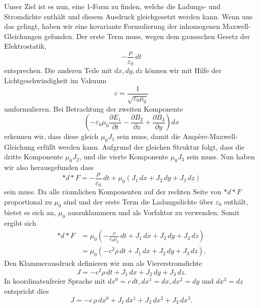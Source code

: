 Unser Ziel ist es nun, eine 1-Form zu finden, welche die Ladungs- und Stromdichte enthält und diesem Ausdruck gleichgesetzt werden kann.
Wenn uns das gelingt, haben wir eine kovariante Formulierung der inhomogenen Maxwell-Gleichungen gefunden.
Der erste Term muss, wegen dem gaussschen Gesetz der Elektrostatik, 
\begin{equation*}
	-\frac{\rho}{\varepsilon_0} \,dt
\end{equation*}
entsprechen.
Die anderen Teile mit $dx,dy,dz$ können wir mit Hilfe der Lichtgeschwindigkeit im Vakuum 
\begin{equation*}
	c = \frac{1}{\sqrt{\varepsilon_0 \mu_0}}
\end{equation*}
umformulieren.
Bei Betrachtung der zweiten Komponente
\begin{equation*}
	\left(-\varepsilon_0 \mu_0 \frac{\partial E_1}{\partial t} - \frac{\partial B_2}{\partial z} + \frac{\partial B_3}{\partial y}\right)dx
\end{equation*}
erkennen wir, dass diese gleich $\mu_0 J_1$ sein muss, damit die Ampère-Maxwell-Gleichung erfüllt werden kann.
Aufgrund der gleichen Struktur folgt, dass die dritte Komponente $\mu_0 J_2$, und die vierte Komponente $\mu_0 J_3$ sein muss.
Nun haben wir also herausgefunden dass
\begin{equation}
	\ast d \ast F = -\frac{\rho}{\varepsilon_0}\,dt + \mu_0 (J_1 \,dx +  J_2 \,dy +  J_3 \,dz)
\end{equation}
sein muss.
Da alle räumlichen Komponenten auf der rechten Seite von $\ast d \ast F$ proportional zu $\mu_0$ sind und der erste Term die Ladungsdichte über $\varepsilon_0$ enthält, bietet es sich an, $\mu_0$ auszuklammern und als Vorfaktor zu verwenden.
Somit ergibt sich
\begin{align*}
	\ast d \ast F
	& = \mu_0 \left( -\frac{\rho}{\varepsilon_0 \mu_0}\,dt + J_1\, dx + J_2\, dy + J_3\, dz \right)\\[2ex]
	& = \mu_0 \left( -c^2 \rho \,dt + J_1 \,dx + J_2 \,dy + J_3 \,dz \right).
\end{align*}
Den Klammerausdruck definieren wir nun als Viererstromdichte
\begin{equation}
	J = -c^2 \rho\, dt + J_1 \,dx + J_2 \,dy + J_3 \,dz.
\end{equation}
In koordinatenfreier Sprache mit $dx^0 = c\,dt, dx^1 = dx,dx^2=dy$ und $dx^3 = dz$ entspricht dies
\begin{equation}
	J = -c\,\rho\,dx^0 + J_1 \,dx^1 + J_2 \,dx^2 + J_3 \,dx^3.
\end{equation}

